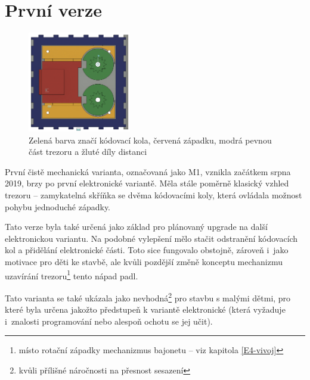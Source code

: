\section{První verze}
\label{M1-vyvoj}

\begin{figure}
    \centering
    \includegraphics[width=0.4\textwidth]{kapitoly/obrazky/M1/mechanizmus.png}
    \caption{Zelená barva značí kódovací kola, červená západku, modrá pevnou část trezoru a žluté díly distanci \centering}
    \label{fig:M1-mechanizmus}
\end{figure}
První čistě mechanická varianta, označovaná jako M1, vznikla začátkem srpna 2019, brzy po první  elektronické variantě.
Měla stále poměrně klasický vzhled trezoru -- zamykatelná skříňka se dvěma  kódovacími koly, která ovládala možnost pohybu jednoduché západky.

Tato verze byla také určená jako základ pro plánovaný upgrade na další elektronickou
variantu. Na podobné vylepšení mělo stačit odstranění kódo\-va\-cích kol a přidělání elektronické části. Toto sice fungovalo obstojně, zároveň 
i~jako motivace pro děti ke stavbě, ale kvůli pozdější změně konceptu mechanizmu uzavírání trezoru\footnote{místo rotační západky mechanizmus bajonetu -- viz 
kapitola \ref{E4-vivoj}} tento nápad padl.

Tato varianta se také ukázala jako nevhodná\footnote{kvůli přílišné náročnosti na přesnost sesazení} pro stavbu s malými dětmi, 
pro které byla určena jakožto předstupeň k variantě elektronické (která vyžaduje i~znalosti programování nebo alespoň ochotu se jej učit).